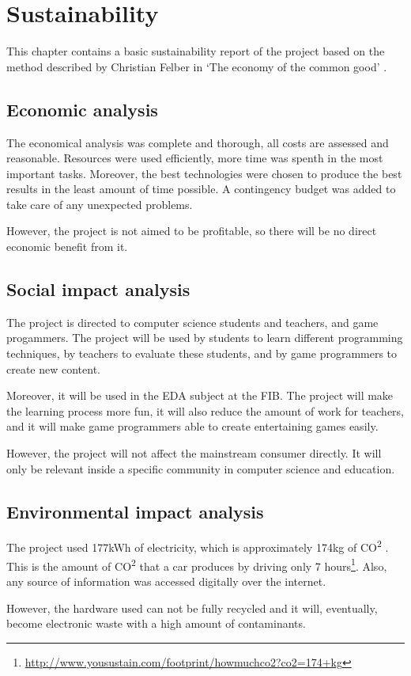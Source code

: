 \documentclass[a4paper,11pt,titlepage,abstract,numbers=noenddot,automark,mnsy,intlimits,rgb,dvipsnames]{report}
\begin{document}
\chapter{Sustainability}
This chapter contains a basic sustainability report of the project based on the method described by
Christian Felber in `The economy of the common good' \cite{sustainability_report}.
\section{Economic analysis}
The economical analysis was complete and thorough, all costs are assessed and reasonable.
Resources were used efficiently, more time was spenth in the most important tasks. Moreover, the best technologies
were chosen to produce the best results in the least amount of time possible. A contingency budget was added
to take care of any unexpected problems.

However, the project is not aimed to be profitable, so there will be no direct economic benefit from it.
\section{Social impact analysis}
The project is directed to computer science students and teachers, and game progammers. The project
will be used by students to learn different programming techniques, by teachers to evaluate these students, and
by game programmers to create new content.

Moreover, it will be used in the EDA subject at the FIB. The project will make the learning process more fun, it will also
reduce the amount of work for teachers, and it will make game programmers able to create entertaining games easily.

However, the project will not affect the mainstream consumer directly. It will only be relevant inside a specific
community in computer science and education.
\section{Environmental impact analysis}
The project used 177kWh of electricity, which is approximately 174kg of CO\textsuperscript{2} \cite{co2}.
This is the amount of CO\textsuperscript{2} that a car produces by driving only 7
hours\footnote{\url{http://www.yousustain.com/footprint/howmuchco2?co2=174+kg}}. Also, any source of
information was accessed digitally over the internet.

However, the hardware used can not be fully recycled and it will, eventually, become electronic waste
with a high amount of contaminants.
\end{document}
